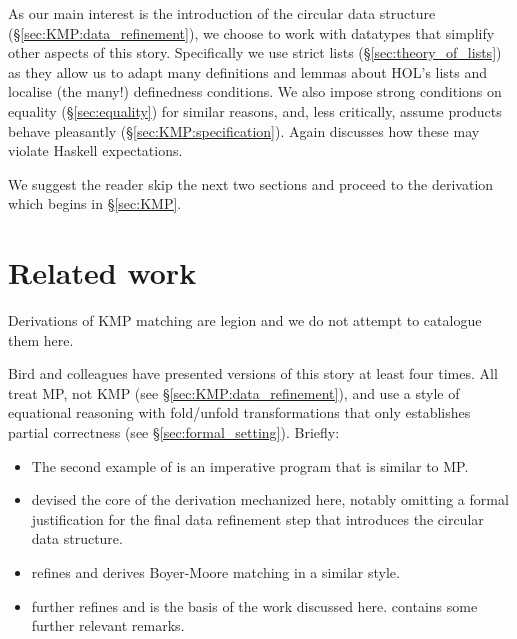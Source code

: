 \documentclass[11pt,a4paper]{article}
\begin{document}
As our main interest is the introduction of the circular data
structure (\S\ref{sec:KMP:data_refinement}), we choose to work with
datatypes that simplify other aspects of this story. Specifically we
use strict lists (\S\ref{sec:theory_of_lists}) as they allow us to
adapt many definitions and lemmas about HOL's lists and localise (the
many!) definedness conditions. We also impose strong conditions on
equality (\S\ref{sec:equality}) for similar reasons, and, less
critically, assume products behave pleasantly
(\S\ref{sec:KMP:specification}). Again \citet{Tullsen:PhDThesis}
discusses how these may violate Haskell expectations.

We suggest the reader skip the next two sections and proceed to the
derivation which begins in \S\ref{sec:KMP}.




\section{Related work\label{sec:related-work}}

Derivations of KMP matching are legion and we do not attempt to
catalogue them here.

Bird and colleagues have presented versions of this story at least
four times. All treat MP, not KMP (see
\S\ref{sec:KMP:data_refinement}), and use a style of equational
reasoning with fold/unfold transformations
\citep{BurstallDarlington:1977} that only establishes partial
correctness (see \S\ref{sec:formal_setting}). Briefly:

\begin{itemize}

\item The second example of \citet{Bird:1977} is an imperative program
  that is similar to MP.

\item \citet{BirdGibbonsJones:1989} devised the core of the derivation
  mechanized here, notably omitting a formal justification for the
  final data refinement step that introduces the circular data
  structure.

\item \citet{Bird:2005} refines \citet{BirdGibbonsJones:1989} and
  derives Boyer-Moore matching \citep[\S2.2]{Gusfield:1997} in a
  similar style.

\item \citet[Chapter~17]{Bird:PearlsofFAD:2010} further refines
  \citet{Bird:2005} and is the basis of the work discussed here.
  \citet[\S3.1]{Bird:2012} contains some further relevant remarks.

\end{itemize}
\end{document}
